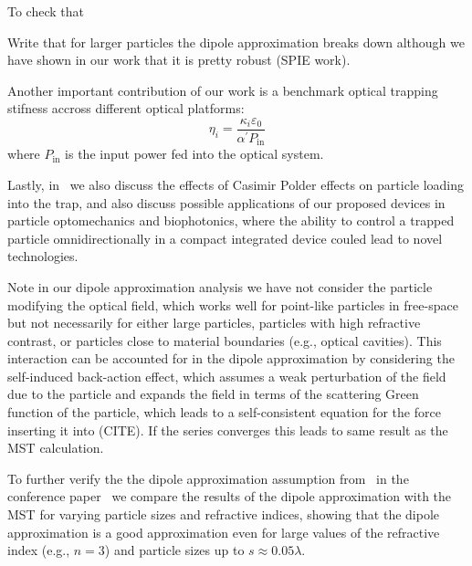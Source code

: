 To check that 




Write that for larger particles the dipole approximation breaks down
although we have shown in our work that it is pretty robust (SPIE work).

Another important contribution of our work is a benchmark optical trapping stifness accross different
optical platforms:
\begin{equation}
    \eta_i=\frac{\kappa_i \varepsilon_0}{\alpha^\prime P_{\text{in}}}
\end{equation}
where $P_{\text{in}}$ is the input power fed into the optical system. 


Lastly, in~\cite{ownpub2} we also discuss the effects of Casimir Polder effects on particle loading into the trap, and
also discuss possible applications of our proposed devices in particle optomechanics and
biophotonics, where the ability to control a trapped particle omnidirectionally in a compact integrated device
couled lead to novel technologies.


Note in our dipole approximation analysis we have not consider the particle modifying
the optical field, which works well for point-like particles in free-space but not necessarily 
for either large particles, particles with high refractive contrast, or particles close to material
boundaries (e.g., optical cavities). This interaction can be accounted for in the dipole
approximation by considering the self-induced back-action effect, which assumes a weak
perturbation of the field due to the particle and expands the field in terms of 
the scattering Green function of the particle, which leads to a self-consistent
equation for the force inserting it into (CITE). If the series converges this leads 
to same result as the MST calculation. 

To further verify the the dipole approximation assumption from~\cite{ownpub2} in the 
conference paper~\cite{ownpub3} we compare the results of the dipole approximation with the MST
for varying particle sizes and refractive indices, showing that the dipole approximation is a good approximation
even for large values of the refractive index (e.g., $n=3$) and particle sizes up to $s\approx 0.05 \lambda$. 

